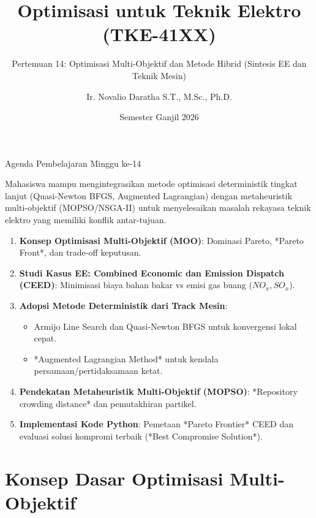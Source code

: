 \documentclass[10pt,aspectratio=169]{beamer}
\title[Optimisasi TE: Pertemuan 14]{Optimisasi untuk Teknik Elektro (TKE-41XX)}
\subtitle{Pertemuan 14: Optimisasi Multi-Objektif dan Metode Hibrid (Sintesis EE dan Teknik Mesin)}
\author[N. Daratha]{Ir. Novalio Daratha S.T., M.Sc., Ph.D.}
\institute[Teknik Elektro UNIB]{Program Studi S1 Teknik Elektro\\Fakultas Teknik --- Universitas Bengkulu}
\date{Semester Ganjil 2026}
\begin{document}
\begin{frame}
    \titlepage
\end{frame}

\begin{frame}{Agenda Pembelajaran Minggu ke-14}
    \begin{tcolorbox}[colback=unibblue!5,colframe=unibblue,title=\textbf{Tujuan Pembelajaran Sintesis (CPMK-4 \& CPMK-5)}]
        Mahasiswa mampu mengintegrasikan metode optimisasi deterministik tingkat lanjut (Quasi-Newton BFGS, Augmented Lagrangian) dengan metaheuristik multi-objektif (MOPSO/NSGA-II) untuk menyelesaikan masalah rekayasa teknik elektro yang memiliki konflik antar-tujuan.
    \end{tcolorbox}

    \vspace{0.3cm}
    \begin{enumerate}
        \item \textbf{Konsep Optimisasi Multi-Objektif (MOO)}: Dominasi Pareto, *Pareto Front*, dan trade-off keputusan.
        \item \textbf{Studi Kasus EE: Combined Economic dan Emission Dispatch (CEED)}: Minimisasi biaya bahan bakar vs emisi gas buang ($NO_x, SO_x$).
        \item \textbf{Adopsi Metode Deterministik dari Track Mesin}:
            \begin{itemize}
                \item Armijo Line Search dan Quasi-Newton BFGS untuk konvergensi lokal cepat.
                \item *Augmented Lagrangian Method* untuk kendala persamaan/pertidaksamaan ketat.
            \end{itemize}
        \item \textbf{Pendekatan Metaheuristik Multi-Objektif (MOPSO)}: *Repository crowding distance* dan pemutakhiran partikel.
        \item \textbf{Implementasi Kode Python}: Pemetaan *Pareto Frontier* CEED dan evaluasi solusi kompromi terbaik (*Best Compromise Solution*).
    \end{enumerate}
\end{frame}

\section{Konsep Dasar Optimisasi Multi-Objektif}
\end{document}
